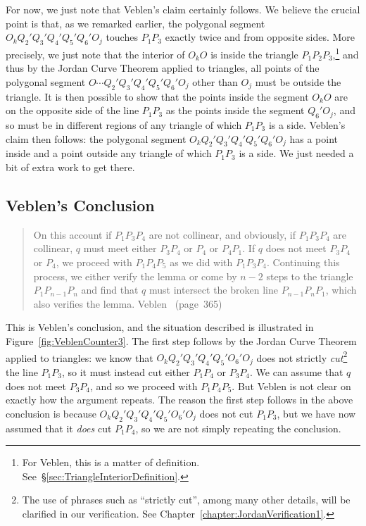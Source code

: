 For now, we just note that Veblen's claim certainly follows. We believe the crucial point is that, as we remarked earlier, the polygonal segment $O_kQ_2'Q_3'Q_4'Q_5'Q_6'O_j$ touches $P_1P_3$ exactly twice and from opposite sides. More precisely, we just note that the interior of $O_kO$ is inside the triangle $P_1P_2P_3$,\footnote{For Veblen, this is a matter of definition. See~\S\ref{sec:TriangleInteriorDefinition}.} and thus by the Jordan Curve Theorem applied to triangles, all points of the polygonal segment $O\cdots Q_2'Q_3'Q_4'Q_5'Q_6'O_j$ other than $O_j$ must be outside the triangle. It is then possible to show that the points inside the segment $O_kO$ are on the opposite side of the line $P_1P_3$ as the points inside the segment $Q_6'O_j$, and so must be in different regions of any triangle of which $P_1P_3$ is a side. Veblen's claim then follows: the polygonal segment $O_kQ_2'Q_3'Q_4'Q_5'Q_6'O_j$ has a point inside and a point outside any triangle of which $P_1P_3$ is a side. We just needed a bit of extra work to get there.

\subsection{Veblen's Conclusion}
\begin{quotation}
On this account if $P_1P_3P_4$ are not collinear, and obviously, if $P_1P_3P_4$ are collinear, $q$ must meet either $P_3P_4$ or $P_4$ or $P_4P_1$. If $q$ does not meet $P_3P_4$ or $P_4$, we proceed with $P_1P_4P_5$ as we did with $P_1P_3P_4$. Continuing this process, we either verify the lemma or come by $n-2$ steps to the triangle $P_1P_{n-1}P_n$ and find that $q$ must intersect the broken line $P_{n-1}P_nP_1$, which also verifies the lemma. Veblen~\cite{Veblenphd} (page~365)
\end{quotation}

This is Veblen's conclusion, and the situation described is illustrated in Figure~\ref{fig:VeblenCounter3}. The first step follows by the Jordan Curve Theorem applied to triangles: we know that $O_kQ_2'Q_3'Q_4'Q_5'O_6'O_j$ does not strictly \emph{cut}\footnote{The use of phrases such as ``strictly cut'', among many other details, will be clarified in our verification. See Chapter~\ref{chapter:JordanVerification1}.} the line $P_1P_3$, so it must instead cut either $P_1P_4$ or $P_3P_4$. We can assume that $q$ does not meet $P_3P_4$, and so we proceed with $P_1P_4P_5$. But Veblen is not clear on exactly how the argument repeats. The reason the first step follows in the above conclusion is because $O_kQ_2'Q_3'Q_4'Q_5'O_6'O_j$ does not cut $P_1P_3$, but we have now assumed that it \emph{does} cut $P_1P_4$, so we are not simply repeating the conclusion. 


